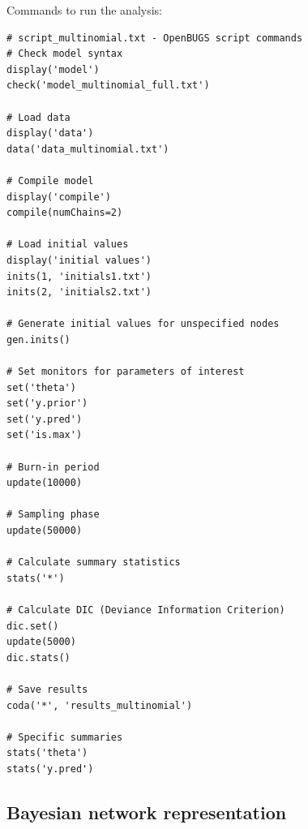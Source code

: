 Commands to run the analysis:
{\small
\begin{codebox}
\begin{verbatim}
# script_multinomial.txt - OpenBUGS script commands
# Check model syntax
display('model')
check('model_multinomial_full.txt')

# Load data
display('data')
data('data_multinomial.txt')

# Compile model
display('compile')
compile(numChains=2)

# Load initial values
display('initial values')
inits(1, 'initials1.txt')
inits(2, 'initials2.txt')

# Generate initial values for unspecified nodes
gen.inits()

# Set monitors for parameters of interest
set('theta')
set('y.prior')
set('y.pred')
set('is.max')

# Burn-in period
update(10000)

# Sampling phase
update(50000)

# Calculate summary statistics
stats('*')

# Calculate DIC (Deviance Information Criterion)
dic.set()
update(5000)
dic.stats()

# Save results
coda('*', 'results_multinomial')

# Specific summaries
stats('theta')
stats('y.pred')
\end{verbatim}
\end{codebox}
}

\subsection{Bayesian network representation}

